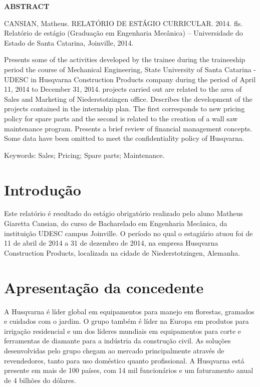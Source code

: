 \documentclass[12pt]{article}
\begin{document}
{
	\noindent
	
	\begin{center}
	{
		\bf ABSTRACT
	}\\[3cm]
	\end{center} 
	
	\begin{flushright}
	{
		CANSIAN, Matheus. RELATÓRIO DE ESTÁGIO CURRICULAR. 2014. \pageref{LastPage} fls. Relatório de estágio (Graduação em Engenharia Mecânica) – Universidade do Estado de Santa Catarina, Joinville, 2014. 
	}\\[2cm]
	\end{flushright}
	
	Presents some of the activities developed by the trainee during the traineeship period the course of Mechanical Engineering, State University of Santa Catarina - UDESC in Husqvarna Construction Products company during the period of April 11, 2014 to December 31, 2014. projects carried out are related to the area of Sales and Marketing of Niederstotzingen office. Describes the development of the projects contained in the internship plan. The first corresponds to new pricing policy for spare parts and the second is related to the creation of a wall saw maintenance program. Presents a brief review of financial management concepts. Some data have been omitted to meet the confidentiality policy of Husqvarna.
	
	\vfill

	{
		Keywords: Sales; Pricing; Spare parts; Maintenance.
	}
}
\pagebreak


\section{Introdução}

	Este relatório é resultado do estágio obrigatório realizado pelo aluno Matheus Giaretta Cansian, do curso de Bacharelado em Engenharia Mecânica, da instituição UDESC campus Joinville.
	O período no qual o estagiário atuou foi de 11 de abril de 2014 a 31 de dezembro de 2014, na empresa Husqvarna Construction Products, localizada na cidade de Niederstotzingen, Alemanha.
\pagebreak

\section{Apresentação da concedente}

	A Husqvarna é líder global em equipamentos para manejo em florestas, gramados e cuidados com o jardim. O grupo também é líder na Europa em produtos para irrigação residencial e um dos líderes mundiais em equipamentos para corte e ferramentas de diamante para a indústria da construção civil. As soluções desenvolvidas pelo grupo chegam ao mercado principalmente através de revendedores, tanto para uso doméstico quanto profissional. A Husqvarna está presente em mais de 100 países, com 14 mil funcionários e um faturamento anual de 4 bilhões do dólares.
\end{document}
